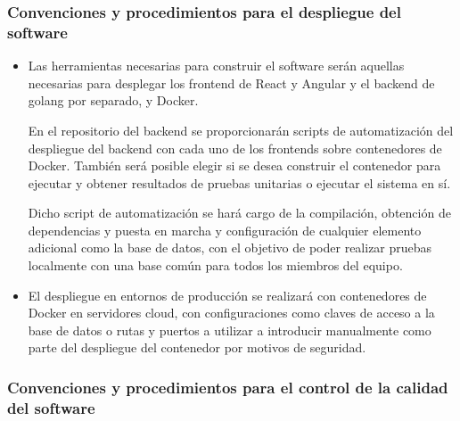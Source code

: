 \documentclass[11pt, a4paper, titlepage]{article}
\begin{document}
\subsubsection{Convenciones y procedimientos para el despliegue del software}

\begin{itemize}
    \item Las herramientas necesarias para construir el software serán aquellas necesarias para desplegar los frontend de React y Angular y el backend de golang por separado, y Docker. \newline
    
    En el repositorio del backend se proporcionarán scripts de automatización del despliegue del backend con cada uno de los frontends sobre contenedores de Docker. También será posible elegir si se desea construir el contenedor para ejecutar y obtener resultados de pruebas unitarias o ejecutar el sistema en sí. \newline
    
    Dicho script de automatización se hará cargo de la compilación, obtención de dependencias y puesta en marcha y configuración de cualquier elemento adicional como la base de datos, con el objetivo de poder realizar pruebas localmente con una base común para todos los miembros del equipo.
    
    \item El despliegue en entornos de producción se realizará con contenedores de Docker en servidores cloud, con configuraciones como claves de acceso a la base de datos o rutas y puertos a utilizar a introducir manualmente como parte del despliegue del contenedor por motivos de seguridad.
\end{itemize}

\subsubsection{Convenciones y procedimientos para el control de la calidad del software}
\end{document}
